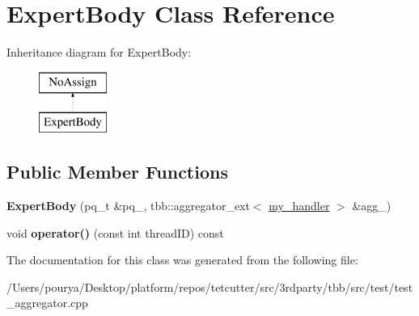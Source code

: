 \hypertarget{classExpertBody}{}\section{Expert\+Body Class Reference}
\label{classExpertBody}
Inheritance diagram for Expert\+Body\+:\begin{figure}[H]
\begin{center}
\leavevmode
\includegraphics[height=2.000000cm]{classExpertBody}
\end{center}
\end{figure}
\subsection*{Public Member Functions}
\begin{DoxyCompactItemize}
\item 
\hypertarget{classExpertBody_a3ffd9e01ff544b17a6acff15b12bd827}{}{\bfseries Expert\+Body} (pq\+\_\+t \&pq\+\_\+, tbb\+::aggregator\+\_\+ext$<$ \hyperlink{classmy__handler}{my\+\_\+handler} $>$ \&agg\+\_\+)\label{classExpertBody_a3ffd9e01ff544b17a6acff15b12bd827}

\item 
\hypertarget{classExpertBody_a4ac41b935a311c67dae880e10f625421}{}void {\bfseries operator()} (const int thread\+I\+D) const \label{classExpertBody_a4ac41b935a311c67dae880e10f625421}

\end{DoxyCompactItemize}


The documentation for this class was generated from the following file\+:\begin{DoxyCompactItemize}
\item 
/\+Users/pourya/\+Desktop/platform/repos/tetcutter/src/3rdparty/tbb/src/test/test\+\_\+aggregator.\+cpp\end{DoxyCompactItemize}
